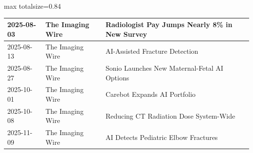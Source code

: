 \documentclass[aspectratio=169]{beamer}
\begin{document}
\begin{frame}
\begin{adjustbox}{max totalsize={\textwidth}{0.84\textheight}}
\begin{tabular}{|l|l|>{\raggedright\arraybackslash}p{}|>{\raggedright\arraybackslash}p{}|}
2025-08-03 & The Imaging Wire & Radiologist Pay Jumps Nearly 8\% in New Survey &  \\ \hline
2025-08-13 & The Imaging Wire & AI-Assisted Fracture Detection &  \\ \hline
2025-08-27 & The Imaging Wire & Sonio Launches New Maternal-Fetal AI Options &  \\ \hline
2025-10-01 & The Imaging Wire & Carebot Expands AI Portfolio &  \\ \hline
2025-10-08 & The Imaging Wire & Reducing CT Radiation Dose System-Wide &  \\ \hline
2025-11-09 & The Imaging Wire & AI Detects Pediatric Elbow Fractures &  \\ \hline
\end{tabular}
\end{adjustbox}
\end{frame}
\end{document}
